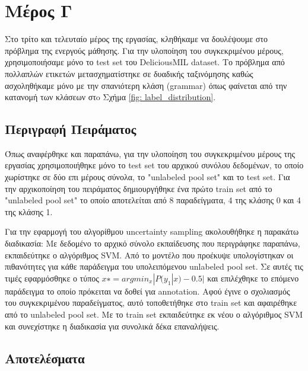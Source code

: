 \section{Μέρος Γ}
Στο τρίτο και τελευταίο μέρος της εργασίας, κληθήκαμε να δουλέψουμε στο πρόβλημα της ενεργούς μάθησης. Για την υλοποίηση του συγκεκριμένου μέρους, χρησιμοποιήσαμε μόνο το test set του DeliciousMIL dataset. Το πρόβλημα από πολλαπλών ετικετών μετασχηματίστηκε σε δυαδικής ταξινόμησης καθώς ασχοληθήκαμε μόνο με την σπανιότερη κλάση (grammar) όπως φαίνεται από την κατανομή των κλάσεων στo Σχήμα \ref{fig: label_distribution}. 

\subsection{Περιγραφή Πειράματος}

Όπως αναφέρθηκε και παραπάνω, για την υλοποίηση του συγκεκριμένου μέρους της εργασίας χρησιμοποιήθηκε μόνο το test set του αρχικού συνόλου δεδομένων, το οποίο χωρίστηκε σε δύο επι μέρους σύνολα, το "unlabeled pool set" και το test set. Για την αρχικοποίηση του πειράματος δημιουργήθηκε ένα πρώτο train set από το "unlabeled pool set" το οποίο αποτελείται από 8 παραδείγματα, 4 της κλάσης 0 και 4 της κλάσης 1. 

Για την εφαρμογή του αλγορίθμου uncertainty sampling ακολουθήθηκε η παρακάτω διαδικασία:
Με δεδομένο το αρχικό σύνολο εκπαίδευσης που περιγράφηκε παραπάνω, εκπαιδεύτηκε ο αλγόριθμος SVM. Από το μοντέλο που προέκυψε υπολογίστηκαν οι πιθανότητες για κάθε παράδειγμα του υπολειπόμενου unlabeled pool set. Σε αυτές τις τιμές εφαρμόσθηκε ο τύπος $ 𝑥∗=argmin_𝑥|𝑃(𝑦_1|𝑥)−0.5|$ και επιλέχθηκε το επόμενο παράδειγμα το οποίο πρόκειται να δοθεί για annotation. Αφού έγινε ο σχολιασμός του συγκεκριμένου παραδείγματος, αυτό τοποθετήθηκε στο train set και αφαιρέθηκε από το unlabeled pool set. Με το train set εκπαιδεύτηκε εκ νέου ο αλγόριθμος SVM και συνεχίστηκε η διαδικασία για συνολικά δέκα επαναλήψεις. 

%	
 


\subsection{Αποτελέσματα}

